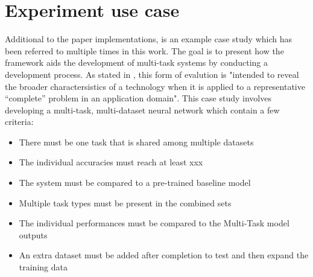 \section{Experiment use case}

% 






Additional to the paper implementations, is an example case study which has been referred to multiple times in this work. The goal is to present how the framework aids the development of multi-task systems by conducting a development process. As stated in \cite{brown1996framework}, this form of evalution is "intended to reveal the broader charactersistics of a technology when it is applied to a representative “complete” problem in an application domain". This case study involves developing a multi-task, multi-dataset neural network which contain a few criteria: \\

\begin{itemize}
	\item There must be one task that is shared among multiple datasets
	\item The individual accuracies must reach at least xxx
	\item The system must be compared to a pre-trained baseline model
	\item Multiple task types must be present in the combined sets
	\item The individual performances must be compared to the Multi-Task model outputs
	\item An extra dataset must be added after completion to test and then expand the training data
\end{itemize}




